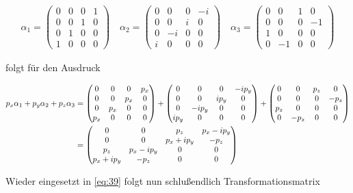 \begin{align}
  \label{eq:40}
  \alpha_1 = \begin{pmatrix}
   0&0&0&1\\
   0&0&1&0\\
 0&1&0&0\\
 1&0&0&0
  \end{pmatrix}\quad
 \alpha_2 = \begin{pmatrix}
   0&0&0&-i\\
   0&0&i&0\\
 0&-i&0&0\\
 i&0&0&0
  \end{pmatrix}\quad
 \alpha_3 = \begin{pmatrix}
   0&0&1&0\\
   0&0&0&-1\\
 1&0&0&0\\
 0&-1&0&0
  \end{pmatrix}
\end{align}

folgt für den Ausdruck

\begin{align}
  \label{eq:41}
  p_x\alpha_1+p_y\alpha_2+p_z\alpha_3 &=
  \begin{pmatrix}
     0&0&0&p_x\\
   0&0&p_x&0\\
 0&p_x&0&0\\
 p_x&0&0&0
  \end{pmatrix}+ \begin{pmatrix}
   0&0&0&-ip_y\\
   0&0&ip_y&0\\
 0&-ip_y&0&0\\
 ip_y&0&0&0
  \end{pmatrix}+
 \begin{pmatrix}
   0&0&p_z&0\\
   0&0&0&-p_z\\
 p_z&0&0&0\\
 0&-p_z&0&0
  \end{pmatrix}\notag\\
&=  \begin{pmatrix}
     0&0&p_z&p_x-ip_y\\
   0&0&p_x+ip_y&-p_z\\
 p_z&p_x-ip_y&0&0\\
 p_x+ip_y&-p_z&0&0
  \end{pmatrix}
\end{align}

Wieder eingesetzt in \eqref{eq:39} folgt nun schlußendlich Transformationsmatrix

